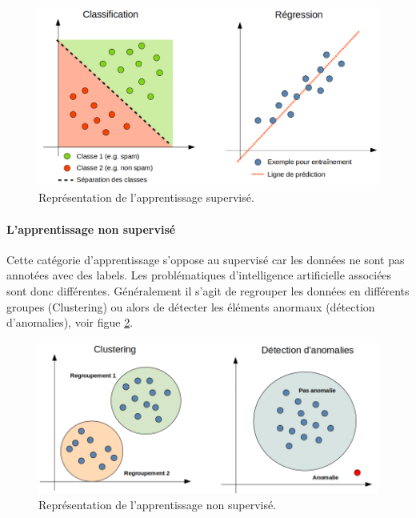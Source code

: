 \documentclass[10pt, french, a4paper]{article}
\begin{document}
\begin{figure}[hbt!]
    \centering
    \includegraphics[width=\textwidth]{images/apprentissage_supervise.png}
    \caption{Représentation de l'apprentissage supervisé.}
    \label{fig:apprentissage_supervise}
\end{figure}

\paragraph{L'apprentissage non supervisé}
Cette catégorie d'apprentissage s'oppose au supervisé car les données ne sont pas annotées avec des labels. Les problématiques d'intelligence artificielle associées sont donc différentes. Généralement il s'agit de regrouper les données en différents groupes (Clustering) ou alors de détecter les éléments anormaux (détection d'anomalies), voir figue \ref{fig:apprentissage_non_supervise}.

\begin{figure}[hbt!]
    \centering
    \includegraphics[width=\textwidth]{images/apprentissage_non_supervise.png}
    \caption{Représentation de l'apprentissage non supervisé.}
    \label{fig:apprentissage_non_supervise}
\end{figure}
\end{document}
